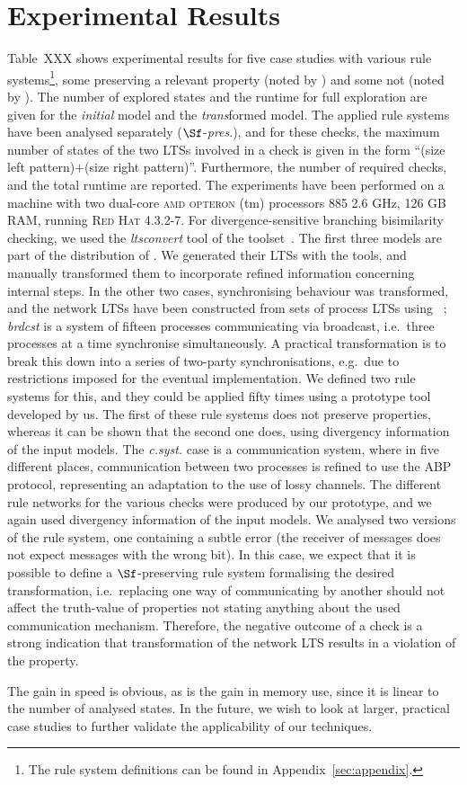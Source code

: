 \section{Experimental Results}
\label{sec:case_studies:exp}

Table~XXX shows experimental results for five case studies with various rule systems\footnote{The rule system definitions can be found in Appendix~\ref{sec:appendix}.}, some preserving a relevant property (noted by \accept) and some not (noted by \reject).
The number of explored states and the runtime for full exploration are given for the {\it initial} model and the {\it trans}formed model.
The applied rule systems have been analysed separately ($\Sf$-{\it pres}.), and for these checks, the maximum number of states of the two LTSs involved in a check is given in the form ``(size left pattern)$+$(size right pattern)''.
Furthermore, the number of required checks, and the total runtime are reported.
The experiments have been performed on a machine with two dual-core \textsc{amd opteron} (tm) processors 885 2.6 GHz, 126 GB RAM, running \textsc{Red Hat} 4.3.2-7.
For divergence-sensitive branching bisimilarity checking, we used the {\it ltsconvert} tool of the \mCRLTwo toolset~\cite{mcrl2}.
The first three models are part of the distribution of \mCRLTwo.
We generated their LTSs with the \mCRLTwo tools, and manually transformed them to incorporate refined information concerning internal steps.
In the other two cases, synchronising behaviour was transformed, and the network LTSs have been constructed from sets of process LTSs using \EXPOPEN~\cite{lang05};
{\it brdcst} is a system of fifteen processes communicating via broadcast, i.e.\ three processes at a time synchronise simultaneously.
A practical transformation is to break this down into a series of two-party synchronisations, e.g.\ due to restrictions imposed for the eventual implementation.
We defined two rule systems for this, and they could be applied fifty times using a prototype tool developed by us.
The first of these rule systems does not preserve properties, whereas it can be shown that the second one does, using divergency information of the input models.
The {\it c.syst.} case is a communication system, where in five different places, communication between two processes is refined to use the ABP protocol, representing an adaptation to the use of lossy channels.
The different rule networks for the various checks were produced by our prototype, and we again used divergency information of the input models.
We analysed two versions of the rule system, one containing a subtle error (the receiver of messages does not expect messages with the wrong bit).
In this case, we expect that it is possible to define a $\Sf$-preserving rule system formalising the desired transformation, i.e.\ replacing one way of communicating by another should not affect the truth-value of properties not stating anything about the used communication mechanism.
Therefore, the negative outcome of a check is a strong indication that transformation of the network LTS results in a violation of the property.

The gain in speed is obvious, as is the gain in memory use, since it is linear to the number of analysed states.
In the future, we wish to look at larger, practical case studies to further validate the applicability of our techniques. 